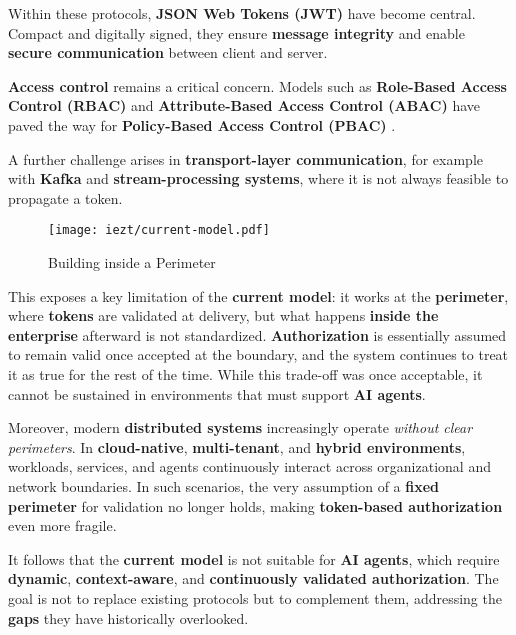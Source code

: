 \vspace{0.5em} Within these protocols, \textbf{JSON Web Tokens (JWT)} \cite{c6} have become central. 
Compact and digitally signed, they ensure \textbf{message integrity} and enable \textbf{secure communication} between client and server.  

\vspace{0.5em} \textbf{Access control} remains a critical concern. Models such as \textbf{Role-Based Access Control (RBAC)} and \textbf{Attribute-Based Access Control (ABAC)} have paved the way for \textbf{Policy-Based Access Control (PBAC)} \cite{c7}.  

\vspace{0.5em} A further challenge arises in \textbf{transport-layer communication}, for example with \textbf{Kafka} and \textbf{stream-processing systems}, where it is not always feasible to propagate a token.

\begin{figure}[htbp]
    \centering
    \texttt{[image: iezt/current-model.pdf]}
    \caption{Building inside a Perimeter}
    \label{fig:current-model}
\end{figure}

\vspace{0.5em} This exposes a key limitation of the \textbf{current model}: it works at the \textbf{perimeter}, where \textbf{tokens} are validated at delivery, but what happens \textbf{inside the enterprise} afterward is not standardized. 
\textbf{Authorization} is essentially assumed to remain valid once accepted at the boundary, and the system continues to treat it as true for the rest of the time.  
While this trade-off was once acceptable, it cannot be sustained in environments that must support \textbf{AI agents}.  

Moreover, modern \textbf{distributed systems} increasingly operate \emph{without clear perimeters}. 
In \textbf{cloud-native}, \textbf{multi-tenant}, and \textbf{hybrid environments}, workloads, services, and agents continuously interact across organizational and network boundaries. 
In such scenarios, the very assumption of a \textbf{fixed perimeter} for validation no longer holds, making \textbf{token-based authorization} even more fragile.  

It follows that the \textbf{current model} is not suitable for \textbf{AI agents}, which require \textbf{dynamic}, \textbf{context-aware}, and \textbf{continuously validated authorization}. 
The goal is not to replace existing protocols but to complement them, addressing the \textbf{gaps} they have historically overlooked.
